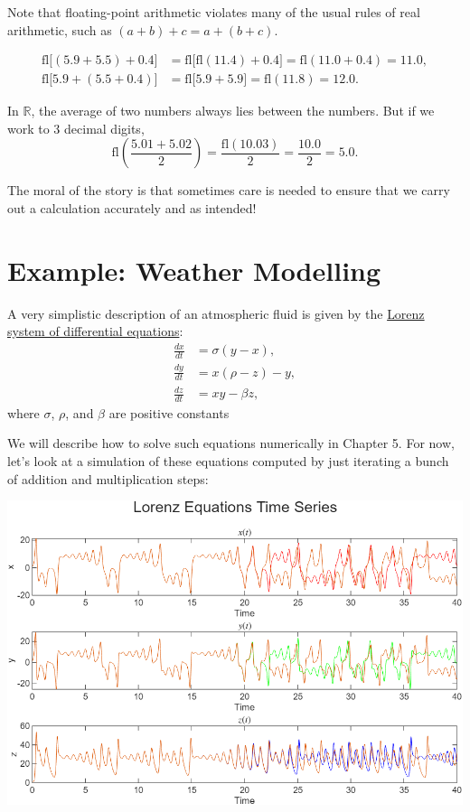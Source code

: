\documentclass[
  letterpaper,
  DIV=11,
  numbers=noendperiod]{scrreprt}
\begin{document}
Note that floating-point arithmetic violates many of the usual rules of
real arithmetic, such as \((a+b)+c = a + (b+c)\).

\[
\begin{aligned}
\mathrm{fl}\big[(5.9 + 5.5) + 0.4\big] &= \mathrm{fl}\big[\mathrm{fl}(11.4) + 0.4\big] = \mathrm{fl}(11.0 + 0.4) = 11.0,\\
\mathrm{fl}\big[5.9 + (5.5 + 0.4)\big] &= \mathrm{fl}\big[5.9 + 5.9 \big] = \mathrm{fl}(11.8) = 12.0.
\end{aligned}
\]

In \(\mathbb{R}\), the average of two numbers always lies between the
numbers. But if we work to 3 decimal digits, \[
\mathrm{fl}\left(\frac{5.01 + 5.02}{2}\right) = \frac{\mathrm{fl}(10.03)}{2} = \frac{10.0}{2} = 5.0.
\]

The moral of the story is that sometimes care is needed to ensure that
we carry out a calculation accurately and as intended!

\section{Example: Weather Modelling}\label{example-weather-modelling}

A very simplistic description of an atmospheric fluid is given by the
\href{https://en.wikipedia.org/wiki/Lorenz_system}{Lorenz system of
differential equations}: \[
\begin{aligned}
\frac{dx}{dt} &= \sigma(y-x),\\
\frac{dy}{dt} &= x(\rho-z)-y,\\
\frac{dz}{dt} &= xy-\beta z,
\end{aligned}
\] where \(\sigma\), \(\rho\), and \(\beta\) are positive constants

We will describe how to solve such equations numerically in Chapter 5.
For now, let's look at a simulation of these equations computed by just
iterating a bunch of addition and multiplication steps:

\begin{center}
\includegraphics[width=0.7\linewidth,height=\textheight,keepaspectratio]{im/Lorenz.png}
\end{center}
\end{document}
